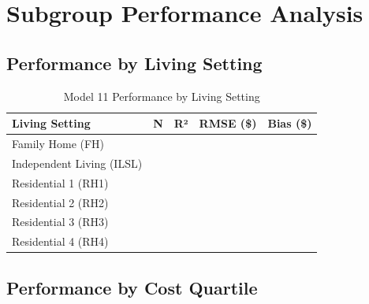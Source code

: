 \section{Subgroup Performance Analysis}

\subsection{Performance by Living Setting}

\begin{table}[h]
\centering
\caption{Model 11 Performance by Living Setting}
\label{tab:model11_living_setting}
\begin{tabular}{lrrrc}
\toprule
\textbf{Living Setting} & \textbf{N} & \textbf{R²} & \textbf{RMSE (\$)} & \textbf{Bias (\$)} \\
\midrule
Family Home (FH) & \ModelElevenSubgroupLivingFHN{} & \ModelElevenSubgroupLivingFHRSquared{} & \ModelElevenSubgroupLivingFHRMSE{} & \ModelElevenSubgroupLivingFHBias{} \\
Independent Living (ILSL) & \ModelElevenSubgroupLivingILSLN{} & \ModelElevenSubgroupLivingILSLRSquared{} & \ModelElevenSubgroupLivingILSLRMSE{} & \ModelElevenSubgroupLivingILSLBias{} \\
Residential 1 (RH1) & \ModelElevenSubgroupLivingRHOneN{} & \ModelElevenSubgroupLivingRHOneRSquared{} & \ModelElevenSubgroupLivingRHOneRMSE{} & \ModelElevenSubgroupLivingRHOneBias{} \\
Residential 2 (RH2) & \ModelElevenSubgroupLivingRHTwoN{} & \ModelElevenSubgroupLivingRHTwoRSquared{} & \ModelElevenSubgroupLivingRHTwoRMSE{} & \ModelElevenSubgroupLivingRHTwoBias{} \\
Residential 3 (RH3) & \ModelElevenSubgroupLivingRHThreeN{} & \ModelElevenSubgroupLivingRHThreeRSquared{} & \ModelElevenSubgroupLivingRHThreeRMSE{} & \ModelElevenSubgroupLivingRHThreeBias{} \\
Residential 4 (RH4) & \ModelElevenSubgroupLivingRHFourN{} & \ModelElevenSubgroupLivingRHFourRSquared{} & \ModelElevenSubgroupLivingRHFourRMSE{} & \ModelElevenSubgroupLivingRHFourBias{} \\
\bottomrule
\end{tabular}
\end{table}

\subsection{Performance by Cost Quartile}

